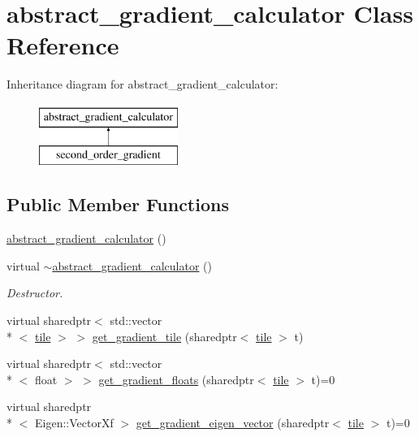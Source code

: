 \hypertarget{classabstract__gradient__calculator}{\section{abstract\-\_\-gradient\-\_\-calculator Class Reference}
\label{classabstract__gradient__calculator}
}
Inheritance diagram for abstract\-\_\-gradient\-\_\-calculator\-:\begin{figure}[H]
\begin{center}
\leavevmode
\includegraphics[height=2.000000cm]{classabstract__gradient__calculator}
\end{center}
\end{figure}
\subsection*{Public Member Functions}
\begin{DoxyCompactItemize}
\item 
\hyperlink{classabstract__gradient__calculator_a259548d80ec064ee93f8342bbd9d16f3}{abstract\-\_\-gradient\-\_\-calculator} ()
\item 
\hypertarget{classabstract__gradient__calculator_ad492fd85c34849194dc566f32d93e641}{virtual \hyperlink{classabstract__gradient__calculator_ad492fd85c34849194dc566f32d93e641}{$\sim$abstract\-\_\-gradient\-\_\-calculator} ()}\label{classabstract__gradient__calculator_ad492fd85c34849194dc566f32d93e641}

\begin{DoxyCompactList}\small\item\em Destructor. \end{DoxyCompactList}\item 
virtual sharedptr$<$ std\-::vector\\*
$<$ \hyperlink{classtile}{tile} $>$ $>$ \hyperlink{classabstract__gradient__calculator_a18d3f5191a95f8a3bfeb7b79862c0f24}{get\-\_\-gradient\-\_\-tile} (sharedptr$<$ \hyperlink{classtile}{tile} $>$ t)
\item 
virtual sharedptr$<$ std\-::vector\\*
$<$ float $>$ $>$ \hyperlink{classabstract__gradient__calculator_afbc6ee285d21d21b2241cfe643f8adce}{get\-\_\-gradient\-\_\-floats} (sharedptr$<$ \hyperlink{classtile}{tile} $>$ t)=0
\item 
virtual sharedptr\\*
$<$ Eigen\-::\-Vector\-Xf $>$ \hyperlink{classabstract__gradient__calculator_ae101a124df59f5dbcc4d21acffe43ae1}{get\-\_\-gradient\-\_\-eigen\-\_\-vector} (sharedptr$<$ \hyperlink{classtile}{tile} $>$ t)=0
\end{DoxyCompactItemize}


